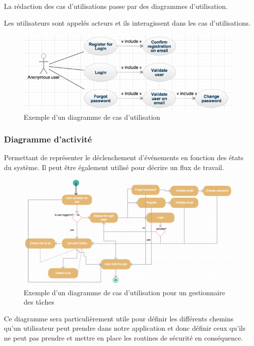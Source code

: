 La rédaction des cas d'utilisations passe par des diagrammes d'utilisation. 

Les utilisateurs sont appelés acteurs et ils interagissent dans les cas d'utilisations.


\begin{figure}[h!]
\centering
\includegraphics[width=1\textwidth]{assets/use_case_exemple.png}
\caption{Exemple d'un diagramme de cas d'utilisation}
\label{fig:my_label}
\end{figure}

\newpage

\subsubsection{Diagramme d'activité}

Permettant de représenter le déclenchement d'événements en fonction des états du système.
Il peut être également utilisé pour décrire un flux de travail. 

\begin{figure}[h!]
\centering
\includegraphics[width=1\textwidth]{assets/activity_diagram.png}
\caption{Exemple d'un diagramme de cas d'utilisation pour un gestionnaire des tâches}
\label{fig:my_label}
\end{figure}

Ce diagramme sera particulièrement utile pour définir les différents chemins qu'un utilisateur peut prendre dans notre application et donc définir ceux qu'ils ne peut pas prendre et mettre en place les routines de sécurité en conséquence. 

